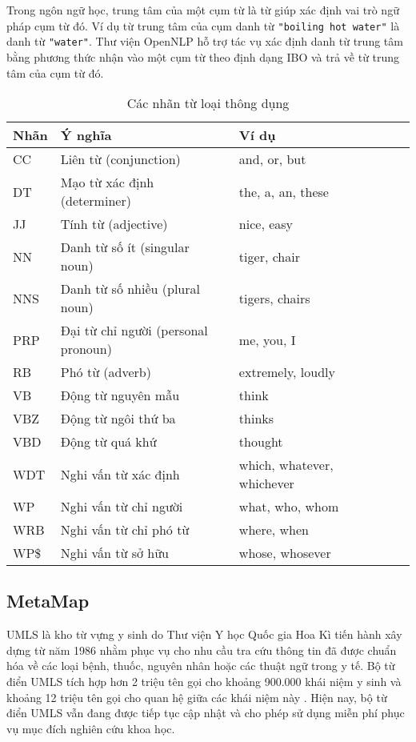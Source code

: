 Trong ngôn ngữ học, trung tâm của một cụm từ là từ giúp xác định vai trò ngữ pháp cụm từ đó. Ví dụ từ trung tâm của cụm danh từ \texttt{"boiling hot water"} là danh từ \texttt{"water"}. Thư viện OpenNLP hỗ trợ tác vụ xác định danh từ trung tâm bằng phương thức nhận vào một cụm từ theo định dạng IBO và trả về từ trung tâm của cụm từ đó.

\begin{table}[t]
\centering{}
\caption{Các nhãn từ loại thông dụng \label{tab:POSTag}}
\footnotesize\sffamily

\begin{tabularx}{0.8\textwidth}{@{}l *5{>{\arraybackslash}X}@{}}
\toprule 
\textbf{Nhãn} & \textbf{Ý nghĩa} & \textbf{Ví dụ}\\
\midrule
CC & Liên từ (conjunction) & and, or, but\\
DT & Mạo từ xác định (determiner) & the, a, an, these\\
JJ & Tính từ (adjective) & nice, easy \\
NN & Danh từ số ít (singular noun) & tiger, chair \\
NNS & Danh từ số nhiều (plural noun) & tigers, chairs \\
PRP & Đại từ chỉ người (personal pronoun) & me, you, I \\
RB & Phó từ (adverb) & extremely, loudly \\
VB & Động từ nguyên mẫu & think  \\
VBZ & Động từ ngôi thứ ba & thinks \\
VBD & Động từ quá khứ & thought \\
WDT & Nghi vấn từ xác định & which, whatever, whichever\\
WP & Nghi vấn từ chỉ người & what, who, whom \\
WRB & Nghi vấn từ chỉ phó từ & where, when \\
WP\$ & Nghi vấn từ sở hữu & whose, whosever \\
\bottomrule
\end{tabularx}
\end{table}

\subsection*{MetaMap}
UMLS là kho từ vựng y sinh do Thư viện Y học Quốc gia Hoa Kì tiến hành xây dựng từ năm 1986 nhằm phục vụ cho nhu cầu tra cứu thông tin đã được chuẩn hóa về các loại bệnh, thuốc, nguyên nhân hoặc các thuật ngữ trong y tế. Bộ từ điển UMLS tích hợp hơn 2 triệu tên gọi cho khoảng 900.000 khái niệm y sinh và khoảng 12 triệu tên gọi cho quan hệ giữa các khái niệm này \cite{Olivier2004}. Hiện nay, bộ từ điển UMLS vẫn đang được tiếp tục cập nhật và cho phép sử dụng miễn phí phục vụ mục đích nghiên cứu khoa học.


